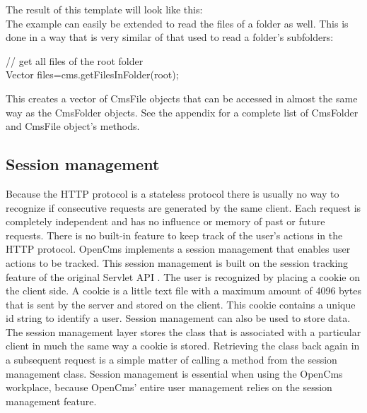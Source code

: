 The result of this template will look like this:\\


The example can easily be extended to read the files of a folder as
well. This is done in a way that is very similar of that used to read a
folder's subfolders:

\begin{java}
// get all files of the root folder\\
Vector files=cms.getFilesInFolder(root);\\
\end{java}

This creates a vector of CmsFile objects that can be accessed in almost
the same way as the CmsFolder objects. See the appendix for a complete
list of CmsFolder and CmsFile object's methods.

\subsection{Session management}

Because the HTTP protocol is a stateless protocol there is usually no
way to recognize if consecutive requests are generated by the same
client. Each request is completely independent and has no influence or
memory of past or future requests. There is no built-in feature to keep
track of the user's actions in the HTTP protocol. OpenCms implements a
session management that enables user actions to be tracked. This
session management is built on the session tracking feature of the
original Servlet API . The user is recognized by placing a cookie on
the client side.  A cookie is  a little text file with a maximum amount
of 4096 bytes that is sent by the server and stored on the client. This
cookie contains a unique id string to identify a user. Session
management can also be used to store data. The session management layer
stores the class that is associated with a particular client in much
the same way a cookie is stored. Retrieving the class back again in a
subsequent request is a simple matter of calling a method from the
session management class.
Session management is essential when using the OpenCms workplace,
because OpenCms' entire user management relies on the session
management feature.

